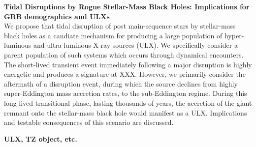 {\bf Tidal Disruptions by Rogue Stellar-Mass Black Holes:  Implications for GRB demographics and ULXs}\\

We propose that tidal disruption of post main-sequence stars by stellar-mass black holes as a candiate mechanism for
producing a large population of hyper-luminous and ultra-luminous X-ray sources (ULX).  We specifically consider a parent population of such systems which occurs through dynamical encounters.  The short-lived transient event immediately following a major disruption is highly energetic and produces a signature at XXX.  However, we primarily consider the aftermath of a disruption event, during which the source declines from highly super-Eddington mass accretion rates, to the sub-Eddington regime.  During this long-lived transitional phase, lasting thousands of years, the accretion of the giant remnant onto the stellar-mass black hole would manifest as a ULX.   Implications and testable consequences of this scenario are discussed.


{\bf ULX, TZ object, etc.}


